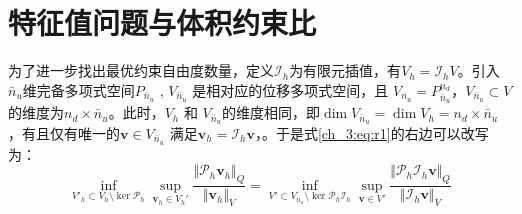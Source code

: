 \section{特征值问题与体积约束比}

为了进一步找出最优约束自由度数量，定义$\mathcal I_h$为有限元插值，有$V_h=\mathcal I_h V$。引入$\bar{n}_u$维完备多项式空间$P_{\bar{n}_u}$ , $V_{\bar{n}_u}$ 是相对应的位移多项式空间，且 $V_{n_u} = P_{\bar{n}_u}^{n_d}$，$V_{\bar{n}_u} \subset V$的维度为$n_d\times \bar{n}_u$。此时，$V_h$ 和 $V_{\bar{n}_u}$的维度相同，即$\dim V_{\bar{n}_u}=\dim V_h = n_d\times \bar{n}_u$，有且仅有唯一的$\boldsymbol v \in V_{\bar{n}_u}$ 满足$\boldsymbol v_h = \mathcal I_h \boldsymbol v$，。于是式\eqref{ch_3:eq:r1}的右边可以改写为：
\begin{equation}\label{ch_3:eq:r21}
    \inf_{V'_h \subset V_h\setminus \ker \mathcal P_h}\sup_{\boldsymbol v_h \in V_h'} \frac{\Vert \mathcal P_h \boldsymbol v_h \Vert_Q}{\Vert \boldsymbol v_h \Vert_V} = 
    \inf_{V'\subset V_{\bar{n}_u}\setminus \ker \mathcal P_h \mathcal I_h}\sup_{\boldsymbol v \in V'} \frac{\Vert \mathcal P_h \mathcal I_h \boldsymbol v \Vert_Q}{\Vert \mathcal I_h \boldsymbol v \Vert_V}
\end{equation}

